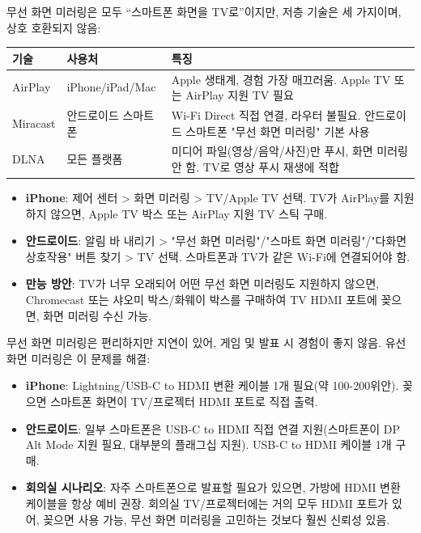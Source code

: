 


무선 화면 미러링은 모두 “스마트폰 화면을 TV로”이지만, 저층 기술은 세 가지이며, 상호 호환되지 않음:

\begin{center}
\begin{tabularx}{\linewidth}{|X|X|X|}
\hline
\textbf{기술} & \textbf{사용처} & \textbf{특징} \tabularnewline
\hline
AirPlay & iPhone/iPad/Mac & Apple 생태계, 경험 가장 매끄러움. Apple TV 또는 AirPlay 지원 TV 필요 \tabularnewline
Miracast & 안드로이드 스마트폰 & Wi-Fi Direct 직접 연결, 라우터 불필요. 안드로이드 스마트폰 "무선 화면 미러링" 기본 사용 \tabularnewline
DLNA & 모든 플랫폼 & 미디어 파일(영상/음악/사진)만 푸시, 화면 미러링 안 함. TV로 영상 푸시 재생에 적합 \tabularnewline
\hline
\end{tabularx}
\end{center}


\begin{itemize}
  \item \textbf{iPhone}: 제어 센터 > 화면 미러링 > TV/Apple TV 선택. TV가 AirPlay를 지원하지 않으면, Apple TV 박스 또는 AirPlay 지원 TV 스틱 구매.
  \item \textbf{안드로이드}: 알림 바 내리기 > "무선 화면 미러링"/"스마트 화면 미러링"/"다화면 상호작용" 버튼 찾기 > TV 선택. 스마트폰과 TV가 같은 Wi-Fi에 연결되어야 함.
  \item \textbf{만능 방안}: TV가 너무 오래되어 어떤 무선 화면 미러링도 지원하지 않으면, Chromecast 또는 샤오미 박스/화웨이 박스를 구매하여 TV HDMI 포트에 꽂으면, 화면 미러링 수신 가능.
\end{itemize}


무선 화면 미러링은 편리하지만 지연이 있어, 게임 및 발표 시 경험이 좋지 않음. 유선 화면 미러링은 이 문제를 해결:

\begin{itemize}
  \item \textbf{iPhone}: Lightning/USB-C to HDMI 변환 케이블 1개 필요(약 100-200위안). 꽂으면 스마트폰 화면이 TV/프로젝터 HDMI 포트로 직접 출력.
  \item \textbf{안드로이드}: 일부 스마트폰은 USB-C to HDMI 직접 연결 지원(스마트폰이 DP Alt Mode 지원 필요, 대부분의 플래그십 지원). USB-C to HDMI 케이블 1개 구매.
  \item \textbf{회의실 시나리오}: 자주 스마트폰으로 발표할 필요가 있으면, 가방에 HDMI 변환 케이블을 항상 예비 권장. 회의실 TV/프로젝터에는 거의 모두 HDMI 포트가 있어, 꽂으면 사용 가능, 무선 화면 미러링을 고민하는 것보다 훨씬 신뢰성 있음.
\end{itemize}

